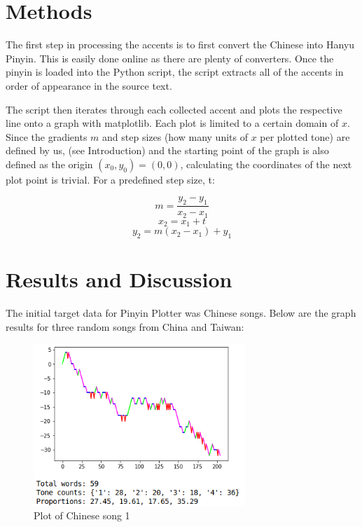 \documentclass[11pt, a4paper]{article}
\begin{document}
  \section{Methods}
    The first step in processing the accents is to first convert the Chinese into Hanyu Pinyin. This is easily done online as there are plenty of converters. Once the pinyin is loaded into the Python script, the script extracts all of the accents in order of appearance in the source text.

    The script then iterates through each collected accent and plots the respective line onto a graph with matplotlib. Each plot is limited to a certain domain of $x$. Since the gradients $m$ and step sizes (how many units of $x$ per plotted tone) are defined by us, (see Introduction) and the starting point of the graph is also defined as the origin $(x_0, y_0) = (0, 0)$, calculating the coordinates of the next plot point is trivial. For a predefined step size, t:

    \begin{equation}
      m =\frac{y_2 - y_1}{x_2 - x_1}
    \end{equation}
    \begin{equation}
      x_2 = x_1 + t
    \end{equation}
    \begin{equation}
      y_2 = m(x_2 - x_1) + y_1
    \end{equation}

  \section{Results and Discussion}
    The initial target data for Pinyin Plotter was Chinese songs. Below are the graph results for three random songs from China and Taiwan:

    \begin{figure}[H]
      \includegraphics[width=8cm]{qnzl}
      \centering
      \caption{Plot of Chinese song 1}
    \end{figure}
\end{document}
